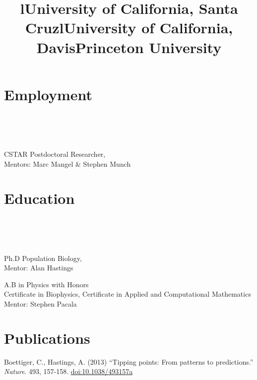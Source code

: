 \documentclass[margin]{res}
\begin{document}
\begin{resume}

\section{Employment}
\begin{format}
\title{l}\\\\
\body\\
\end{format}

\title{\textbf{University of California, Santa Cruz}}
\begin{position}
CSTAR Postdoctoral Researcher, \\
Mentors: Marc Mangel \& Stephen Munch 
\end{position}

\section{Education}
\begin{format}
\title{l}\\\\
\body\\
\end{format}

\title{\textbf{University of California, Davis}}
\begin{position}
Ph.D Population Biology, \\
Mentor: Alan Hastings
\end{position}

\title{\textbf{Princeton University}}
\begin{position}
A.B  in Physics with Honors \\ 
Certificate in Biophysics, Certificate in Applied and Computational Mathematics\\
Mentor: Stephen Pacala
\end{position}

\section{Publications}

Boettiger, C., Hastings, A. (2013) ``Tipping points: From patterns to predictions.'' {\it Nature}. 493, 157-158. \href{http://dx.doi.org/10.1038/493157a}{doi:10.1038/493157a}


\end{resume}
\end{document}
